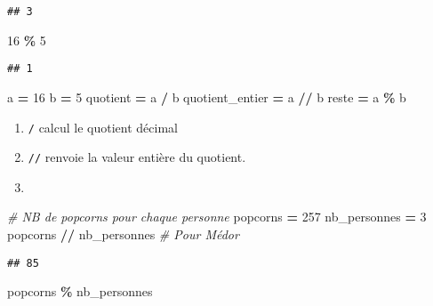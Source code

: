 \documentclass[
]{book}
\newenvironment{Shaded}{\begin{snugshade}}{\end{snugshade}}
\newcommand{\CommentTok}[1]{\textcolor[rgb]{0.56,0.35,0.01}{\textit{#1}}}
\newcommand{\DecValTok}[1]{\textcolor[rgb]{0.00,0.00,0.81}{#1}}
\newcommand{\NormalTok}[1]{#1}
\newcommand{\OperatorTok}[1]{\textcolor[rgb]{0.81,0.36,0.00}{\textbf{#1}}}
\providecommand{\tightlist}{%
  \setlength{\itemsep}{0pt}\setlength{\parskip}{0pt}}
\def\tightlist{}
\begin{document}
\begin{verbatim}
## 3
\end{verbatim}

\begin{Shaded}
\begin{Highlighting}[]
\DecValTok{16} \OperatorTok{\%} \DecValTok{5}
\end{Highlighting}
\end{Shaded}

\begin{verbatim}
## 1
\end{verbatim}

\begin{Shaded}
\begin{Highlighting}[]
\NormalTok{a }\OperatorTok{=} \DecValTok{16}
\NormalTok{b }\OperatorTok{=} \DecValTok{5}
\NormalTok{quotient }\OperatorTok{=}\NormalTok{ a }\OperatorTok{/}\NormalTok{ b}
\NormalTok{quotient\_entier }\OperatorTok{=}\NormalTok{ a }\OperatorTok{//}\NormalTok{ b}
\NormalTok{reste }\OperatorTok{=}\NormalTok{ a }\OperatorTok{\%}\NormalTok{ b}
\end{Highlighting}
\end{Shaded}

\begin{enumerate}
\def\labelenumi{\arabic{enumi}.}
\setcounter{enumi}{1}
\tightlist
\item
  \texttt{/} calcul le quotient décimal
\item
  \texttt{//} renvoie la valeur entière du quotient.
\item
\end{enumerate}

\begin{Shaded}
\begin{Highlighting}[]
\CommentTok{\# NB de popcorns pour chaque personne}
\NormalTok{popcorns }\OperatorTok{=} \DecValTok{257}
\NormalTok{nb\_personnes }\OperatorTok{=} \DecValTok{3}
\NormalTok{popcorns }\OperatorTok{//}\NormalTok{ nb\_personnes}
\CommentTok{\# Pour Médor}
\end{Highlighting}
\end{Shaded}

\begin{verbatim}
## 85
\end{verbatim}

\begin{Shaded}
\begin{Highlighting}[]
\NormalTok{popcorns }\OperatorTok{\%}\NormalTok{ nb\_personnes}
\end{Highlighting}
\end{Shaded}
\end{document}

